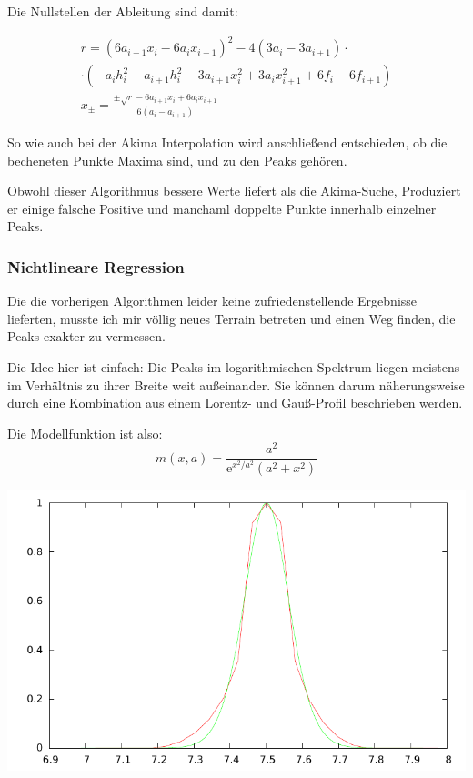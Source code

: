 \documentclass[10pt,a4paper,german]{scrartcl}
\begin{document}
    	Die Nullstellen der Ableitung sind damit:

      \begin{multline}
        r = (6 a_{i+1} x_i-6 a_i x_{i+1})^2 -4 (3 a_i-3 a_{i+1})\cdot\\
        \cdot\left(-a_i h_i^2+a_{i+1} h_i^2-3 a_{i+1} x_i^2+3 a_i x_{i+1}^2+6 f_i-6
        f_{i+1}\right) \\
        x_{\pm} = \frac{\pm\sqrt{r}-6 a_{i+1} x_i+6 a_i x_{i+1}}{6 (a_i-a_{i+1})}
       \end{multline}
       
       So wie auch bei der Akima Interpolation wird anschließend entschieden, ob
       die becheneten Punkte Maxima sind, und zu den Peaks gehören.
       
       Obwohl dieser Algorithmus bessere Werte liefert als die Akima-Suche,
       Produziert er einige falsche Positive und manchaml doppelte Punkte
       innerhalb einzelner Peaks.
       
     \subsubsection*{Nichtlineare Regression}
       Die die vorherigen Algorithmen leider keine zufriedenstellende Ergebnisse
       lieferten, musste ich mir völlig neues Terrain betreten und einen Weg
       finden, die Peaks exakter zu vermessen.
       
       Die Idee hier ist einfach: Die Peaks im logarithmischen Spektrum
       liegen meistens im Verhältnis zu ihrer Breite weit außeinander.
       Sie können darum näherungsweise durch eine Kombination aus
       einem Lorentz- und Gauß-Profil beschrieben werden.

       Die Modellfunktion ist also:
       \begin{equation}
         m(x, a) = \frac{a^2}{\mathrm{e}^{x^2/a^2} (a^2 + x^2)}
       \end{equation}
       
       \includegraphics[scale=.62]{../static/model.pdf}
       
\end{document}
